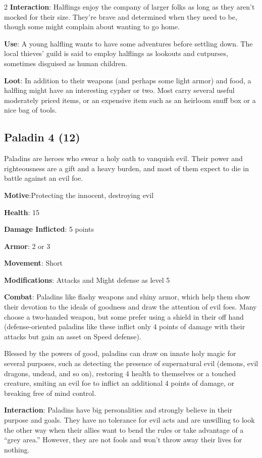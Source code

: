 \begin{multicols}{2}
\textbf{Interaction}: Halflings enjoy the company of larger folks as long as they aren’t mocked for their size. They’re brave and determined when they need to be, though some might complain about wanting to go home. 

\textbf{Use}: A young halfling wants to have some adventures before settling down. The local thieves’ guild is said to employ halflings as lookouts and cutpurses, sometimes disguised as human children. 

\textbf{Loot}: In addition to their weapons (and perhaps some light armor) and food, a halfling might have an interesting cypher or two. Most carry several useful moderately priced items, or an expensive item such as an heirloom snuff box or a nice bag of tools.

\subsection{Paladin 4 (12)}

Paladins are heroes who swear a holy oath to vanquish evil. Their power and righteousness are a gift and a heavy burden, and most of them expect to die in battle against an evil foe. 

\textbf{Motive}:Protecting the innocent, destroying evil 

\textbf{Health}: 15 

\textbf{Damage Inflicted}: 5 points 

\textbf{Armor}: 2 or 3 

\textbf{Movement}: Short 

\textbf{Modifications}: Attacks and Might defense as level 5 

\textbf{Combat}: Paladins like flashy weapons and shiny armor, which help them show their devotion to the ideals of goodness and draw the attention of evil foes. Many choose a two-handed weapon, but some prefer using a shield in their off hand (defense-oriented paladins like these inflict only 4 points of damage with their attacks but gain an asset on Speed defense). 

Blessed by the powers of good, paladins can draw on innate holy magic for several purposes, such as detecting the presence of supernatural evil (demons, evil dragons, undead, and so on), restoring 4 health to themselves or a touched creature, smiting an evil foe to inflict an additional 4 points of damage, or breaking free of mind control. 

\textbf{Interaction}: Paladins have big personalities and strongly believe in their purpose and goals. They have no tolerance for evil acts and are unwilling to look the other way when their allies want to bend the rules or take advantage of a “grey area.” However, they are not fools and won’t throw away their lives for nothing. 


\end{multicols}
